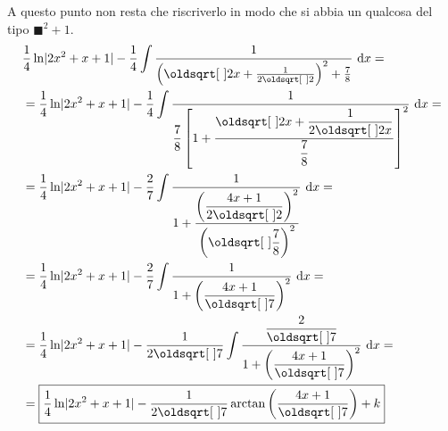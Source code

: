 A questo punto non resta che riscriverlo in modo che si abbia un qualcosa del tipo 
$\blacksquare^2+1$.
\begin{align*}
  &\frac{1}{4}\ln\abs{2x^2+x+1} - 
  \frac{1}{4}\int \frac{1}{\left(\sqrt{2}x+\frac{1}{2\sqrt{2}}\right)^2+\frac{7}{8}}\,\dif x=\\
  &=\frac{1}{4}\ln\abs{2x^2+x+1} -
  \frac{1}{4}\int \ddfrac{1}{\frac{7}{8}
  \left[1+\ddfrac{\sqrt{2}x+\ddfrac{1}{2\sqrt{2}x}}{\ddfrac{7}{8}}\right]^2}\,\dif x =\\
  &=\frac{1}{4}\ln\abs{2x^2+x+1} -
  \frac{2}{7}\int \ddfrac{1}
  {1+\ddfrac{\left(\frac{4x+1}{2\sqrt{2}}\right)^2}{\left(\sqrt{\frac{7}{8}}\right)^2}}\,\dif x=\\
  &=\frac{1}{4}\ln\abs{2x^2+x+1}-
  \frac{2}{7}\int\ddfrac{1}{1+\left( \frac{4x+1}{\sqrt{7}} \right)^2}\,\dif x =\\
  &=\frac{1}{4}\ln\abs{2x^2+x+1}-
  \frac{1}{2\sqrt{7}}\int\ddfrac{\frac{2}{\sqrt{7}}}{1+\left(\frac{4x+1}{\sqrt{7}}\right)^2}
  \,\dif x =\\
&= \boxed{\frac{1}{4}\ln\abs{2x^2+x+1}-\frac{1}{2\sqrt{7}}\arctan\left(\frac{4x+1}{\sqrt{7}}\right)+k}
\end{align*}
